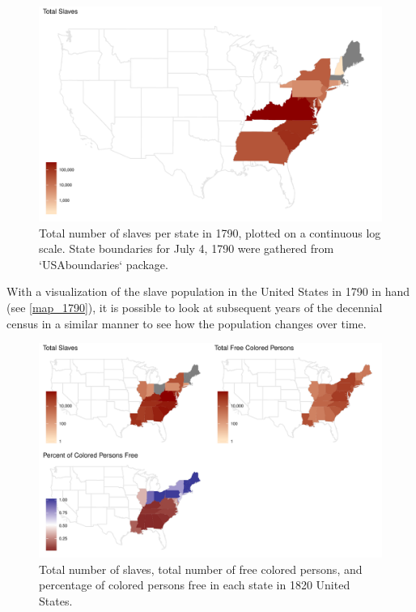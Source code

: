 \documentclass[DIV=calc, paper=a4, fontsize=10pt, twocolumn]{scrartcl}\usepackage[]{graphicx}\usepackage[]{color}
\newenvironment{knitrout}{}{} %
\begin{document}
\begin{knitrout}
\color{fgcolor}\begin{figure}[h]
\includegraphics[width=.5\textwidth]{figure/map_1790-1} \caption[Total number of slaves per state in 1790, plotted on a continuous log scale]{Total number of slaves per state in 1790, plotted on a continuous log scale. State boundaries for July 4, 1790 were gathered from `USAboundaries` package.}\label{fig:map_1790}
\end{figure}


\end{knitrout}


With a visualization of the slave population in the United States in 1790 in hand (see \autoref{map_1790}), it is possible to look at subsequent years of the decennial census in a similar manner to see how the population changes over time.  

\begin{knitrout}
\color{fgcolor}\begin{figure}[h]
\includegraphics[width=.5\textwidth]{figure/map1820-1} \caption[Total number of slaves, total number of free colored persons, and percentage of colored persons free in each state in 1820 United States]{Total number of slaves, total number of free colored persons, and percentage of colored persons free in each state in 1820 United States.}\label{fig:map1820}
\end{figure}


\end{knitrout}
\end{document}
